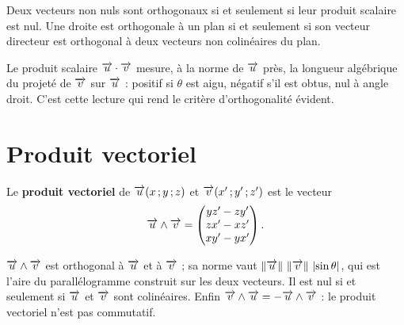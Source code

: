 \begin{propriete}[orthogonalité]
Deux vecteurs non nuls sont orthogonaux si et seulement si leur produit
scalaire est nul. Une droite est orthogonale à un plan si et seulement si son
vecteur directeur est orthogonal à deux vecteurs non colinéaires du plan.
\end{propriete}

\begin{visualisation}
\begin{center}
\end{center}
Le produit scalaire $\overrightarrow{u} \cdot \overrightarrow{v}$ mesure, à la norme de $\overrightarrow{u}$
près, la longueur algébrique du projeté de $\overrightarrow{v}$ sur $\overrightarrow{u}$ : positif si
$\theta$ est aigu, négatif s'il est obtus, nul à angle droit. C'est cette
lecture qui rend le critère d'orthogonalité évident.
\end{visualisation}

\section{Produit vectoriel}

\begin{definition}
Le \textbf{produit vectoriel} de $\overrightarrow{u}(x\,;y\,;z)$ et $\overrightarrow{v}(x'\,;y'\,;z')$
est le vecteur
\[
  \overrightarrow{u} \wedge \overrightarrow{v} =
  \begin{pmatrix}
    yz'-zy' \\ zx'-xz' \\ xy'-yx'
  \end{pmatrix}.
\]
\end{definition}

\begin{propriete}
$\overrightarrow{u} \wedge \overrightarrow{v}$ est orthogonal à $\overrightarrow{u}$ et à $\overrightarrow{v}$ ; sa norme vaut
$\left\lVert \overrightarrow{u} \right\rVert\,\left\lVert \overrightarrow{v} \right\rVert\,\left|\sin\theta\right|$, qui est l'aire du
parallélogramme construit sur les deux vecteurs. Il est nul si et seulement si
$\overrightarrow{u}$ et $\overrightarrow{v}$ sont colinéaires. Enfin
$\overrightarrow{v} \wedge \overrightarrow{u} = -\overrightarrow{u} \wedge \overrightarrow{v}$ : le produit vectoriel n'est
pas commutatif.
\end{propriete}

